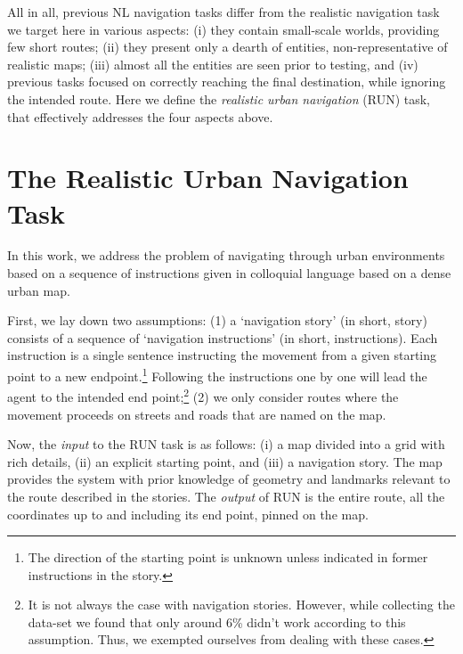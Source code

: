 \documentclass[11pt,a4paper]{article}
\begin{document}
All in all, previous NL navigation tasks differ from  the {realistic  navigation task} we target here in various aspects: (i) they contain small-scale worlds, providing few short routes; (ii) they present only a dearth of entities,  non-representative of  realistic maps; (iii) almost all the entities are seen prior to testing, and  (iv) previous tasks focused on correctly reaching the final destination, while ignoring the intended route.
%
%
Here  we define   the {\em realistic urban navigation} (RUN) task, that effectively addresses the four  aspects above.


\section{The Realistic Urban Navigation  Task}
\label{task}

In this work, we address the problem of navigating through urban environments based on a sequence of instructions given  in colloquial language based on a  dense  urban map. 


First, we lay down two assumptions: (1) a  \enquote*{navigation story}  (in short, story) consists of a sequence of \enquote*{navigation instructions} (in short, instructions). Each instruction is a single sentence instructing the movement from a given starting point to a new endpoint.\footnote{The direction of the starting point is unknown unless indicated in former instructions in the story.}
Following the instructions one by one will lead the agent to the intended end point;\footnote{It is not always the case with navigation stories. However, while collecting the data-set we found that only around 6\% didn't work according to this assumption. Thus, we exempted ourselves from dealing with these cases.} (2) we only consider routes where the movement proceeds on streets and roads that are named on the map.



Now, the {\em input} to the RUN task is as follows: 
(i)
    a map divided into a grid with rich details,
(ii)
    an explicit starting point, and
(iii)
    a navigation story.
The map provides the system with prior knowledge of geometry and landmarks relevant to the route described in the stories. 
The {\em output} of RUN is the entire route,  all the coordinates up to and including its end point, pinned on the map.
\end{document}
